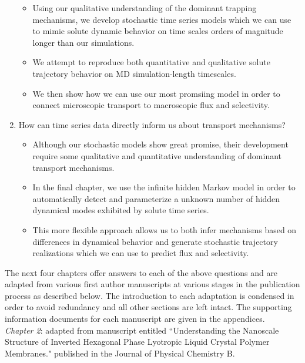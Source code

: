 \begin{enumerate}
\begin{itemize}
    	  \item Using our qualitative understanding of the dominant trapping mechanisms,
    	  we develop stochastic time series models which we can use to mimic solute dynamic
    	  behavior on time scales orders of magnitude longer than our simulations. 
    	  \item We attempt to reproduce both quantitative and qualitative solute trajectory
    	  behavior on MD simulation-length timescales.
    	  \item We then show how we can use our most promsiing model in order to connect 
    	  microscopic transport to macroscopic flux and selectivity.
    	\end{itemize}

    \item How can time series data directly inform us about transport mechanisms?
    	\begin{itemize}
    	  \item Although our stochastic models show great promise, their development 
    	  require some qualitative and quantitative understanding of dominant transport
    	  mechanisms.
    	  \item In the final chapter, we use the infinite hidden Markov model in order
    	  to automatically detect and parameterize a unknown number of hidden dynamical modes
    	  exhibited by solute time series. 
    	  \item This more flexible approach allows us to both infer mechanisms based 
    	  on differences in dynamical behavior and generate stochastic trajectory realizations
    	  which we can use to predict flux and selectivity. 
    	\end{itemize}
  \end{enumerate} 
  
  The next four chapters offer answers to each of the above questions and are adapted from 
  various first author manuscripts at various stages in the publication process as described
  below. The introduction to each adaptation is condensed in order to avoid redundancy and 
  all other sections are left intact. The supporting information documents for each manuscript are
  given in the appendices. \\
  
  \noindent\textit{Chapter 2}: adapted from manuscript entitled ``Understanding the 
  Nanoscale Structure of Inverted Hexagonal Phase Lyotropic Liquid Crystal Polymer Membranes." 
  published in the Journal of Physical Chemistry B.~\cite{coscia_understanding_2019} \\

